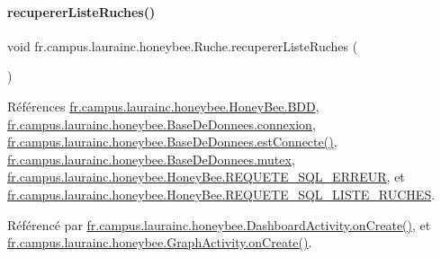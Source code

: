 \paragraph{\texorpdfstring{recuperer\+Liste\+Ruches()}{recupererListeRuches()}}
{\footnotesize\ttfamily void fr.\+campus.\+laurainc.\+honeybee.\+Ruche.\+recuperer\+Liste\+Ruches (\begin{DoxyParamCaption}{ }\end{DoxyParamCaption})}



Références \hyperlink{classfr_1_1campus_1_1laurainc_1_1honeybee_1_1_honey_bee_abfb4f6cc1c8bb793c37ccb8408abc51c}{fr.\+campus.\+laurainc.\+honeybee.\+Honey\+Bee.\+B\+DD}, \hyperlink{classfr_1_1campus_1_1laurainc_1_1honeybee_1_1_base_de_donnees_a358899633f17b8cd00dd2c4cfdd40abe}{fr.\+campus.\+laurainc.\+honeybee.\+Base\+De\+Donnees.\+connexion}, \hyperlink{classfr_1_1campus_1_1laurainc_1_1honeybee_1_1_base_de_donnees_a735f54c2c183a595c9a9a5ba947491f5}{fr.\+campus.\+laurainc.\+honeybee.\+Base\+De\+Donnees.\+est\+Connecte()}, \hyperlink{classfr_1_1campus_1_1laurainc_1_1honeybee_1_1_base_de_donnees_a0dd6f285a11459c086adea6080bed282}{fr.\+campus.\+laurainc.\+honeybee.\+Base\+De\+Donnees.\+mutex}, \hyperlink{classfr_1_1campus_1_1laurainc_1_1honeybee_1_1_honey_bee_a275b7a8582c8193ff444d21928ef7e36}{fr.\+campus.\+laurainc.\+honeybee.\+Honey\+Bee.\+R\+E\+Q\+U\+E\+T\+E\+\_\+\+S\+Q\+L\+\_\+\+E\+R\+R\+E\+UR}, et \hyperlink{classfr_1_1campus_1_1laurainc_1_1honeybee_1_1_honey_bee_afd5c8c4447e00d9a75eb95f83a62a860}{fr.\+campus.\+laurainc.\+honeybee.\+Honey\+Bee.\+R\+E\+Q\+U\+E\+T\+E\+\_\+\+S\+Q\+L\+\_\+\+L\+I\+S\+T\+E\+\_\+\+R\+U\+C\+H\+ES}.



Référencé par \hyperlink{classfr_1_1campus_1_1laurainc_1_1honeybee_1_1_dashboard_activity_a8a6794a48e1b328dfc58d9d1c9237d79}{fr.\+campus.\+laurainc.\+honeybee.\+Dashboard\+Activity.\+on\+Create()}, et \hyperlink{classfr_1_1campus_1_1laurainc_1_1honeybee_1_1_graph_activity_a0a59a4caee62f5c1ce090274c1df66b8}{fr.\+campus.\+laurainc.\+honeybee.\+Graph\+Activity.\+on\+Create()}.


